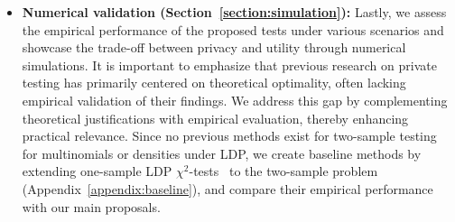 \documentclass[twoside,11pt]{article}
\begin{document}
\begin{itemize}
	\item \textbf{Numerical validation (Section~\ref{section:simulation}):}
	Lastly, we assess the empirical performance of the proposed tests under various scenarios and showcase the trade-off between privacy and utility through numerical simulations. It is important to emphasize that previous research on private testing has primarily centered on theoretical optimality, often lacking empirical validation of their findings. We address this gap by complementing theoretical justifications with empirical evaluation, thereby enhancing practical relevance. Since no previous methods exist for two-sample testing for multinomials or densities under LDP, we create baseline methods by extending one-sample LDP $\chi^2$-tests~\citep{Gaboardi2018LDPChisq} to the two-sample problem (Appendix~\ref{appendix:baseline}), and compare their empirical performance with our main proposals.
\end{itemize}
\end{document}

